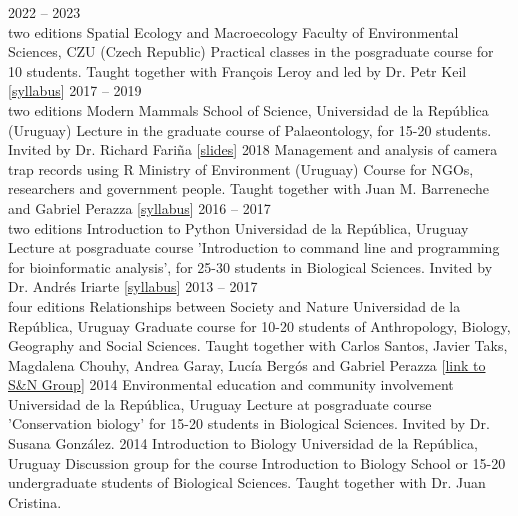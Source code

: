 \documentclass[9pt]{developercv} %
\begin{document}
\begin{entrylist}
	\entry
		{2022 -- 2023\\\footnotesize{two editions}}
		{Spatial Ecology and Macroecology}
		{Faculty of Environmental Sciences, CZU (Czech Republic)}
		{Practical classes in the posgraduate course for 10 students. Taught together with François Leroy and led by Dr. Petr Keil [\href{https://petrkeil.github.io/courses/post/2022/09/09/Spatial_ecology.html}{syllabus}]}
	\entry
		{2017 -- 2019\\\footnotesize{two editions}}
		{Modern Mammals}
		{School of Science, Universidad de la Rep\'{u}blica (Uruguay)}
		{Lecture in the graduate course of Palaeontology, for 15-20 students. Invited by Dr. Richard Fari\~{n}a [\href{https://flograttarola.com/pdf/mamiferos_julana.pdf}{slides}]}
	\entry
		{2018}
		{Management and analysis of camera trap records using R}
		{Ministry of Environment (Uruguay)}
		{Course for NGOs, researchers and government people. Taught together with Juan M. Barreneche and Gabriel Perazza [\href{https://github.com/bienflorencia/curso_camtrapR}{syllabus}]}
	\entry
		{2016 -- 2017\\\footnotesize{two editions}}
		{Introduction to Python}
		{Universidad de la Rep\'{u}blica, Uruguay}
		{Lecture at posgraduate course 'Introduction to command line and programming for bioinformatic analysis', for 25-30 students in Biological Sciences. Invited by Dr. Andr\'{e}s Iriarte [\href{https://github.com/bienflorencia/clases_python}{syllabus}]}
	\entry
		{2013 -- 2017\\\footnotesize{four editions}}
		{Relationships between Society and Nature}
		{Universidad de la Rep\'{u}blica, Uruguay}
		{Graduate course for 10-20 students of Anthropology, Biology, Geography and Social Sciences. Taught together with Carlos Santos, Javier Taks, Magdalena Chouhy, Andrea Garay, Luc\'{i}a Berg\'{o}s and Gabriel Perazza [\href{https://udelar.edu.uy/retema/actividades/grupos-de-trabajo/}{link to S\&N Group}]}
	\entry
		{2014}
		{Environmental education and community involvement}
		{Universidad de la Rep\'{u}blica, Uruguay}
		{Lecture at posgraduate course 'Conservation biology' for 15-20 students in Biological Sciences. Invited by Dr. Susana Gonz\'{a}lez. }
	\entry
		{2014}
		{Introduction to Biology}
		{Universidad de la Rep\'{u}blica, Uruguay}
		{Discussion group for the course Introduction to Biology School or 15-20 undergraduate students of Biological Sciences. Taught together with Dr. Juan Cristina.}
\end{entrylist}
\end{document}

